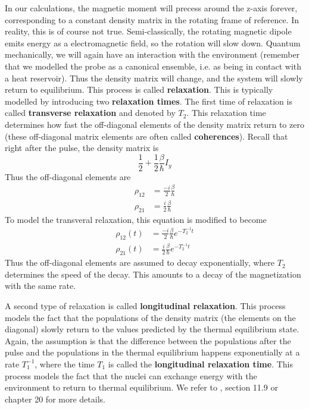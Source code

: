 \documentclass[a4paper, draft]{article}
\theoremstyle{own}
\theoremstyle{remark}
\begin{document}
In our calculations, the magnetic moment will precess around the z-axis forever, corresponding to a constant density matrix in the rotating frame of reference. In reality, this is of course not true. Semi-classically, the rotating magnetic dipole emits energy as a electromagnetic field, so the rotation will slow down. Quantum mechanically, we will again have an interaction with the environment (remember that we modelled the probe as a canonical ensemble, i.e. as being in contact with a heat reservoir). Thus the  
density matrix will change, and the system will slowly return to equilibrium. This process is called {\bf relaxation}. This is typically modelled by introducing two {\bf relaxation times}. The first time of relaxation is called {\bf transverse relaxation} and denoted by $T_2$. This relaxation time determines how fast the off-diagonal elements of the density matrix return to zero (these off-diagonal matrix elements are often called {\bf coherences}). Recall that right after the pulse, the density matrix is
$$
\frac{1}{2} + \frac{1}{2} \frac{\beta}{\hbar} I_y
$$
Thus the off-diagonal elements are 
\begin{align*}
\rho_{12} &= \frac{-i}{2} \frac{\beta}{\hbar} \\
\rho_{21} &= \frac{i}{2} \frac{\beta}{\hbar} 
\end{align*}
To model the transveral relaxation, this equation is modified to become
\begin{align*}
\rho_{12}(t) &= \frac{-i}{2} \frac{\beta}{\hbar} e^{- T_2^{-1} t}\\
\rho_{21}(t) &= \frac{i}{2} \frac{\beta}{\hbar} e^{- T_2^{-1} t}
\end{align*}
Thus the off-diagonal elements are assumed to decay exponentially, where $T_2$ determines the speed of the decay. This amounts to a decay of the magnetization with the same rate. 

A second type of relaxation is called {\bf longitudinal relaxation}. This process models the fact that the populations of the density matrix (the elements on the diagonal) slowly return to the values predicted by the thermal equilibrium state. Again, the assumption is that the difference between the populations after the pulse and the populations in the thermal equilibrium happens exponentially at a rate $T_1^{-1}$, where the time $T_1$ is called the {\bf longitudinal relaxation time}. This process models the fact that the nuclei can exchange energy with the environment to return to thermal equilibrium. We refer to \cite{Levitt}, section 11.9 or chapter 20 for more details. 
\end{document}
